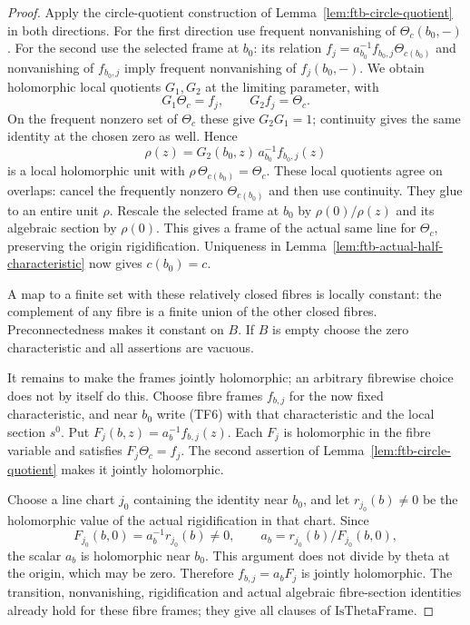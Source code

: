 \begin{proof}
Apply the circle-quotient construction of
Lemma~\ref{lem:ftb-circle-quotient} in both directions.
For the first direction use frequent nonvanishing of
\(\Theta_c(b_0,-)\).
For the second use the selected frame at \(b_0\):
its relation
\(f_j=a_{b_0}^{-1}f_{b_0,j}\Theta_{c(b_0)}\)
and nonvanishing of \(f_{b_0,j}\) imply frequent
nonvanishing of \(f_j(b_0,-)\).
We obtain holomorphic local quotients \(G_1,G_2\) at
the limiting parameter, with
\[
 G_1\Theta_c=f_j,\qquad G_2f_j=\Theta_c .
\]
On the frequent nonzero set of \(\Theta_c\) these give
\(G_2G_1=1\); continuity gives the same identity at the
chosen zero as well.
Hence
\[
 \rho(z)=G_2(b_0,z)\,a_{b_0}^{-1}f_{b_0,j}(z)
\]
is a local holomorphic unit with
\(\rho\,\Theta_{c(b_0)}=\Theta_c\).
These local quotients agree on overlaps: cancel the
frequently nonzero \(\Theta_{c(b_0)}\) and then use
continuity.  They glue to an entire unit \(\rho\).
Rescale the selected frame at \(b_0\) by
\(\rho(0)/\rho(z)\) and its algebraic section by
\(\rho(0)\).  This gives a frame of the actual same
line for \(\Theta_c\), preserving the origin
rigidification.  Uniqueness in
Lemma~\ref{lem:ftb-actual-half-characteristic} now gives
\(c(b_0)=c\).

A map to a finite set with these relatively closed fibres
is locally constant: the complement of any fibre is a
finite union of the other closed fibres.
Preconnectedness makes it constant on \(B\).
If \(B\) is empty choose the zero characteristic and all
assertions are vacuous.

It remains to make the frames jointly holomorphic; an
arbitrary fibrewise choice does not by itself do this.
Choose fibre frames \(f_{b,j}\) for the now fixed
characteristic, and near \(b_0\) write (TF6) with that
characteristic and the local section \(s^0\).
Put \(F_j(b,z)=a_b^{-1}f_{b,j}(z)\).
Each \(F_j\) is holomorphic in the fibre variable and
satisfies \(F_j\Theta_c=f_j\).
The second assertion of
Lemma~\ref{lem:ftb-circle-quotient} makes it jointly
holomorphic.

Choose a line chart \(j_0\) containing the identity near
\(b_0\), and let \(r_{j_0}(b)\ne0\) be the holomorphic
value of the actual rigidification in that chart.
Since
\[
          F_{j_0}(b,0)=a_b^{-1}r_{j_0}(b)\ne0,
 \qquad
          a_b=r_{j_0}(b)/F_{j_0}(b,0),
\]
the scalar \(a_b\) is holomorphic near \(b_0\).
This argument does not divide by theta at the origin,
which may be zero.
Therefore \(f_{b,j}=a_bF_j\) is jointly holomorphic.
The transition, nonvanishing, rigidification and
actual algebraic fibre-section identities already hold
for these fibre frames; they give all clauses of
\(\mathrm{IsThetaFrame}\).
\end{proof}

